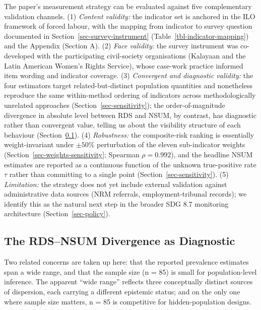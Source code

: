 \documentclass[
  12pt,
  letterpaper,
  DIV=11,
  numbers=noendperiod]{scrartcl}
\begin{document}
The paper's measurement strategy can be evaluated against five
complementary validation channels. (1) \emph{Content validity:} the
indicator set is anchored in the ILO
\autocite*{ILO11-indicators,international_labour_organization_global_2017}
framework of forced labour, with the mapping from indicator to survey
question documented in Section~\ref{sec-survey-instrument}
(Table~\ref{tbl-indicator-mapping}) and the Appendix (Section A). (2)
\emph{Face validity:} the survey instrument was co-developed with the
participating civil-society organisations (Kalayaan and the Latin
American Women's Rights Service), whose case-work practice informed item
wording and indicator coverage. (3) \emph{Convergent and diagnostic
validity:} the four estimators target related-but-distinct population
quantities and nonetheless reproduce the same within-method ordering of
indicators across methodologically unrelated approaches
(Section~\ref{sec-sensitivity}); the order-of-magnitude divergence in
absolute level between RDS and NSUM, by contrast, has diagnostic rather
than convergent value, telling us about the visibility structure of each
behaviour (Section~\ref{sec-divergence}). (4) \emph{Robustness:} the
composite-risk ranking is essentially weight-invariant under
\(\pm 50\%\) perturbation of the eleven sub-indicator weights
(Section~\ref{sec-weights-sensitivity}; Spearman \(\rho = 0.992\)), and
the headline NSUM estimates are reported as a continuous function of the
unknown true-positive rate \(\tau\) rather than committing to a single
point (Section~\ref{sec-sensitivity}). (5) \emph{Limitation:} the
strategy does not yet include external validation against administrative
data sources (NRM referrals, employment-tribunal records); we identify
this as the natural next step in the broader SDG 8.7 monitoring
architecture (Section~\ref{sec-policy}).

\subsection{The RDS--NSUM Divergence as
Diagnostic}\label{sec-divergence}

Two related concerns are taken up here: that the reported prevalence
estimates span a wide range, and that the sample size (n = 85) is small
for population-level inference. The apparent ``wide range'' reflects
three conceptually distinct sources of dispersion, each carrying a
different epistemic status; and on the only one where sample size
matters, n = 85 is competitive for hidden-population designs.
\end{document}
